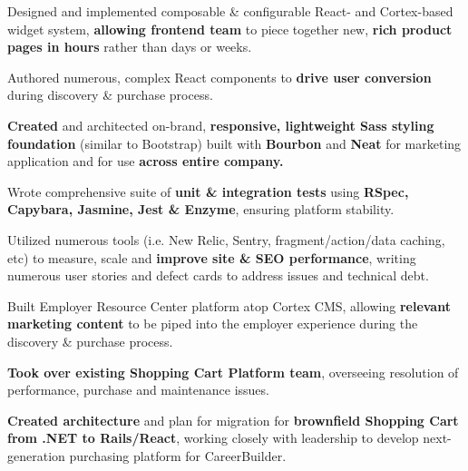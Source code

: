 \begin{cventries}
{\begin{cvitems}
        \item {Designed and implemented composable \& configurable React- and Cortex-based widget system, \textbf{allowing frontend team} to piece together new, \textbf{rich product pages in hours} rather than days or weeks.}
        \item {Authored numerous, complex React components to \textbf{drive user conversion} during discovery \& purchase process.}
        \item {\textbf{Created} and architected on-brand, \textbf{responsive, lightweight Sass styling foundation} (similar to Bootstrap) built with \textbf{Bourbon} and \textbf{Neat} for marketing application and for use \textbf{across entire company.}}
        \item {Wrote comprehensive suite of \textbf{unit \& integration tests} using \textbf{RSpec, Capybara, Jasmine, Jest \& Enzyme}, ensuring platform stability.}
        \item {Utilized numerous tools (i.e. New Relic, Sentry, fragment/action/data caching, etc) to measure, scale and \textbf{improve site \& SEO performance}, writing numerous user stories and defect cards to address issues and technical debt.}
        \item {Built Employer Resource Center platform atop Cortex CMS, allowing \textbf{relevant marketing content} to be piped into the employer experience during the discovery \& purchase process.}
        \item {\textbf{Took over existing Shopping Cart Platform team}, overseeing resolution of performance, purchase and maintenance issues.}
        \item {\textbf{Created architecture} and plan for migration for \textbf{brownfield Shopping Cart from .NET to Rails/React}, working closely with leadership to develop next-generation purchasing platform for CareerBuilder.}
      \end{cvitems}
    }
\end{cventries}
